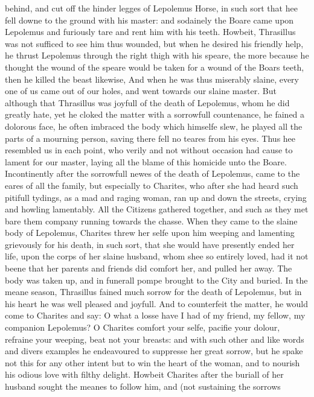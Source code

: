 behind, and cut off the hinder legges of Lepolemus Horse, in such sort that hee
fell downe to the ground with his master: and sodainely the Boare came upon
Lepolemus and furiously tare and rent him with his teeth. Howbeit, Thrasillus
was not sufficed to see him thus wounded, but when he desired his friendly
help, he thrust Lepolemus through the right thigh with his speare, the more
because he thought the wound of the speare would be taken for a wound of the
Boars teeth, then he killed the beast likewise, And when he was thus miserably
slaine, every one of us came out of our holes, and went towards our slaine
master. But although that Thrasillus was joyfull of the death of Lepolemus,
whom he did greatly hate, yet he cloked the matter with a sorrowfull
countenance, he fained a dolorous face, he often imbraced the body which
himselfe slew, he played all the parts of a mourning person, saving there fell
no teares from his eyes. Thus hee resembled us in each point, who verily and
not without occasion had cause to lament for our master, laying all the blame
of this homicide unto the Boare. Incontinently after the sorrowfull newes of
the death of Lepolemus, came to the eares of all the family, but especially to
Charites, who after she had heard such pitifull tydings, as a mad and raging
woman, ran up and down the streets, crying and howling lamentably. All the
Citizens gathered together, and such as they met bare them company running
towards the chasse. When they came to the slaine body of Lepolemus, Charites
threw her selfe upon him weeping and lamenting grievously for his death, in
such sort, that she would have presently ended her life, upon the corps of her
slaine husband, whom shee so entirely loved, had it not beene that her parents
and friends did comfort her, and pulled her away. The body was taken up, and in
funerall pompe brought to the City and buried. In the meane season, Thrasillus
fained much sorrow for the death of Lepolemus, but in his heart he was well
pleased and joyfull. And to counterfeit the matter, he would come to Charites
and say: O what a losse have I had of my friend, my fellow, my companion
Lepolemus? O Charites comfort your selfe, pacifie your dolour, refraine your
weeping, beat not your breasts: and with such other and like words and divers
examples he endeavoured to suppresse her great sorrow, but he spake not this
for any other intent but to win the heart of the woman, and to nourish his
odious love with filthy delight. Howbeit Charites after the buriall of her
husband sought the meanes to follow him, and (not sustaining the sorrows
